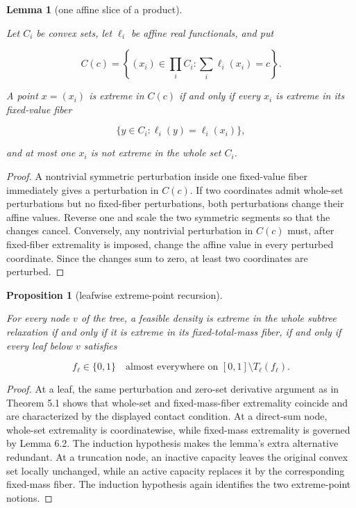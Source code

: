 \documentclass[11pt]{article}
\newtheorem{lemma}[theorem]{Lemma}
\newtheorem{proposition}[theorem]{Proposition}
\numberwithin{equation}{section}
\begin{document}
\begin{lemma}[one affine slice of a product]
\label{lem:affine-slice}

Let $C_i$ be convex sets, let $\ell_i$ be affine real functionals, and put

\nopagebreak[4]
\[
C(c)=\left\{(x_i)\in\prod_iC_i:\sum_i\ell_i(x_i)=c\right\}.
\]

A point $x=(x_i)$ is extreme in $C(c)$ if and only if every $x_i$ is extreme in its
fixed-value fiber

\nopagebreak[4]
\[
\{y\in C_i:\ell_i(y)=\ell_i(x_i)\},
\]

and at most one $x_i$ is not extreme in the whole set $C_i$.

\end{lemma}

\begin{proof}

A nontrivial symmetric perturbation inside one fixed-value fiber immediately gives a
perturbation in $C(c)$. If two coordinates admit whole-set perturbations but no
fixed-fiber perturbations, both perturbations change their affine values. Reverse one
and scale the two symmetric segments so that the changes cancel. Conversely, any
nontrivial perturbation in $C(c)$ must, after fixed-fiber extremality is imposed, change
the affine value in every perturbed coordinate. Since the changes sum to zero, at least
two coordinates are perturbed.
\end{proof}


\begin{proposition}[leafwise extreme-point recursion]
\label{prop:laminar-extreme}

For every node $v$ of the tree, a feasible density is extreme in the whole subtree
relaxation if and only if it is extreme in its fixed-total-mass fiber, if and only if
every leaf below $v$ satisfies

\nopagebreak[4]
\[
f_\ell\in\{0,1\}
\quad\text{almost everywhere on }[0,1]\setminus T_\ell(f_\ell).
\]

\end{proposition}

\begin{proof}

At a leaf, the same perturbation and zero-set derivative argument as in Theorem 5.1
shows that whole-set and fixed-mass-fiber extremality coincide and are characterized by
the displayed contact condition. At a direct-sum node, whole-set extremality is
coordinatewise, while fixed-mass extremality is governed by Lemma 6.2. The induction
hypothesis makes the lemma's extra alternative redundant. At a truncation node, an
inactive capacity leaves the original convex set locally unchanged, while an active
capacity replaces it by the corresponding fixed-mass fiber. The induction hypothesis
again identifies the two extreme-point notions.
\end{proof}
\end{document}
